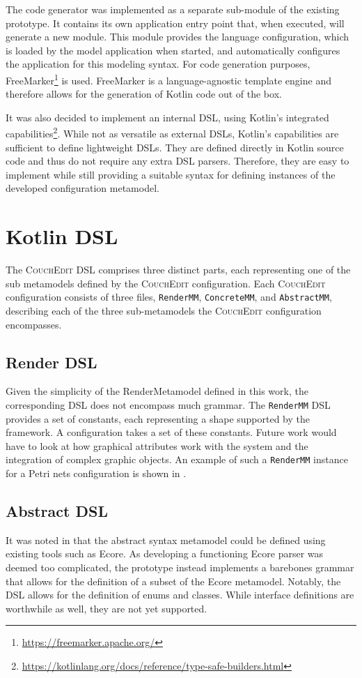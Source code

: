 The code generator was implemented as a separate sub-module of the existing prototype. It contains its own application entry point that, when executed, will generate a new module. This module provides the language configuration, which is loaded by the model application when started, and automatically configures the application for this modeling syntax. For code generation purposes, FreeMarker\footnote{\url{https://freemarker.apache.org/}} is used. FreeMarker is a language-agnostic template engine and therefore allows for the generation of Kotlin code out of the box.

It was also decided to implement an internal DSL, using Kotlin's integrated capabilities\footnote{\url{https://kotlinlang.org/docs/reference/type-safe-builders.html}}. While not as versatile as external DSLs, Kotlin's capabilities are sufficient to define lightweight DSLs. They are defined directly in Kotlin source code and thus do not require any extra DSL parsers. Therefore, they are easy to implement while still providing a suitable syntax for defining instances of the developed configuration metamodel.

\section{Kotlin DSL}
The \textsc{CouchEdit} DSL comprises three distinct parts, each representing one of the sub metamodels defined by the \textsc{CouchEdit} configuration. Each \textsc{CouchEdit} configuration consists of three files, \texttt{RenderMM}, \texttt{ConcreteMM}, and \texttt{AbstractMM}, describing each of the three sub-metamodels the \textsc{CouchEdit} configuration encompasses.

\subsection{Render DSL}
Given the simplicity of the RenderMetamodel defined in this work, the corresponding DSL does not encompass much grammar. The \texttt{RenderMM} DSL provides a set of constants, each representing a shape supported by the framework. A configuration takes a set of these constants. Future work would have to look at how graphical attributes work with the system and the integration of complex graphic objects. An example of such a \texttt{RenderMM} instance for a Petri nets configuration is shown in .

\subsection{Abstract DSL}
It was noted in  that the abstract syntax metamodel could be defined using existing tools such as Ecore. As developing a functioning Ecore parser was deemed too complicated, the prototype instead implements a barebones grammar that allows for the definition of a subset of the Ecore metamodel. Notably, the DSL allows for the definition of enums and classes. While interface definitions are worthwhile as well, they are not yet supported.


